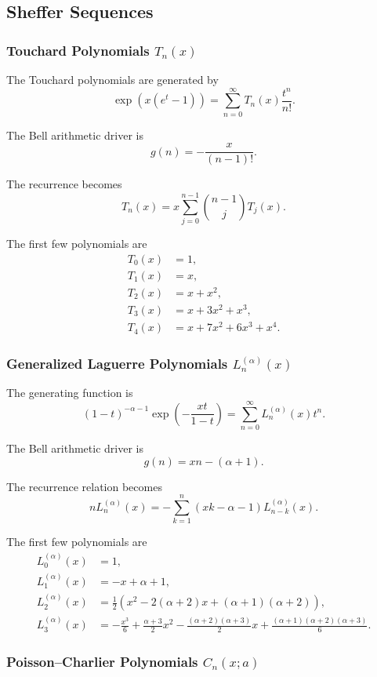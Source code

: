 \documentclass[11pt, a4paper]{article}
\theoremstyle{remark}
\begin{document}
\subsection{Sheffer Sequences}

\subsubsection{Touchard Polynomials \(T_n(x)\)}

The Touchard polynomials are generated by
\[
\exp(x(e^t-1))
=
\sum_{n=0}^{\infty}
T_n(x)\frac{t^n}{n!}.
\]

The Bell arithmetic driver is
\[
g(n)
=
-\frac{x}{(n-1)!}.
\]

The recurrence becomes
\[
\boxed{
T_n(x)
=
x\sum_{j=0}^{n-1}
\binom{n-1}{j}
T_j(x).
}
\]

The first few polynomials are
\[
\begin{aligned}
T_0(x)&=1,\\
T_1(x)&=x,\\
T_2(x)&=x+x^2,\\
T_3(x)&=x+3x^2+x^3,\\
T_4(x)&=x+7x^2+6x^3+x^4.
\end{aligned}
\]

\subsubsection{Generalized Laguerre Polynomials \(L_n^{(\alpha)}(x)\)}

The generating function is
\[
(1-t)^{-\alpha-1}
\exp\!\left(
-\frac{xt}{1-t}
\right)
=
\sum_{n=0}^{\infty}
L_n^{(\alpha)}(x)t^n.
\]

The Bell arithmetic driver is
\[
g(n)=xn-(\alpha+1).
\]

The recurrence relation becomes
\[
\boxed{
nL_n^{(\alpha)}(x)
=
-\sum_{k=1}^n
(xk-\alpha-1)L_{n-k}^{(\alpha)}(x).
}
\]

The first few polynomials are
\[
\begin{aligned}
L_0^{(\alpha)}(x)&=1,\\
L_1^{(\alpha)}(x)&=-x+\alpha+1,\\
L_2^{(\alpha)}(x)&=\frac12
\left(
x^2-2(\alpha+2)x+(\alpha+1)(\alpha+2)
\right),\\
L_3^{(\alpha)}(x)&=
-\frac{x^3}{6}
+\frac{\alpha+3}{2}x^2
-\frac{(\alpha+2)(\alpha+3)}2x
+\frac{(\alpha+1)(\alpha+2)(\alpha+3)}6.
\end{aligned}
\]

\subsubsection{Poisson--Charlier Polynomials \(C_n(x;a)\)}
\end{document}

